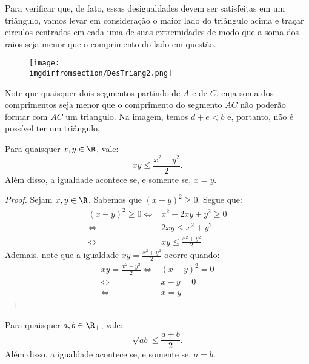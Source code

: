 Para verificar que, de fato, essas desigualdades devem ser satisfeitas em um triângulo, vamos levar em consideração o maior lado do triângulo acima e traçar circulos centrados em cada uma de suas extremidades de modo que a soma dos raios seja menor que o comprimento do lado em questão.

\label{fig:destri2}
\begin{figure}[H]
\texttt{[image: \\imgdirfromsection/DesTriang2.png]}
\centering
\end{figure}

Note que quaisquer dois segmentos partindo de $A$ e de $C$, cuja soma dos comprimentos seja menor que o comprimento do segmento $AC$ não poderão formar com $AC$ um triangulo. Na imagem, temos $d+e < b$ e, portanto, não é possível ter um triângulo.


\begin{theorem}
\label{theorem:ineq-prod-quad}
Para quaisquer $x, y \in \R$, vale:
%
\begin{equation*}
    xy \le \frac {x^2 +y^2} 2.
\end{equation*}
%
Além disso, a igualdade acontece se, e somente se, $x=y$.
\end{theorem}

\begin{proof}
Sejam $x, y \in \R$. Sabemos que $(x-y)^2 \ge 0$. Segue que:
%
\begin{align*}
	(x-y)^2 \ge 0 \iff & x^2 - 2xy + y^2 \ge 0 \\
				  \iff & 2xy \le x^2 + y^2 \\
				  \iff & xy \le \frac {x^2 + y^2} 2
\end{align*}
%
Ademais, note que a igualdade $xy = \frac {x^2 + y^2} 2$ ocorre quando:
%
\begin{align*}
	xy = \frac {x^2 + y^2} 2 \iff & (x-y)^2 = 0 \\
							 \iff & x-y = 0 \\
							 \iff & x = y
\end{align*}
\end{proof}

\begin{theorem}
\label{theo:desigualdade-medias-dois-termos}
Para quaisquer $a, b \in \R_+$, vale:
%
\begin{equation*}
    \sqrt{ab} \leq \frac {a +b} 2.
\end{equation*}
Além disso, a igualdade acontece se, e somente se, $a=b$.
\end{theorem}

